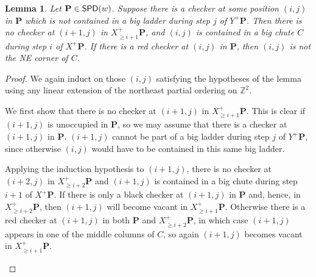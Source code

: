 \documentclass[11pt,reqno]{amsart} %
\makeatletter
\newcommand{\bbZ}{\mathbb{Z}}
\newcommand{\bfP}{\mathbf{P}}
\DeclareMathOperator{\SPD}{\sf{SPD}}
\newenvironment{shift}[1][(0,0)]{
    \begin{scope}[shift={#1}]
}{
    \end{scope}
}
\newtheorem{lemma}[theorem]{Lemma}
\theoremstyle{definition}
\newcommand{\drawSquare}[3][black,opacity=0.5]{
    \draw[#1,thin]
    (#2-0.5,#3+0.5) rectangle (#2+0.5,#3-0.5);
}
\newcommand{\drawGraySquare}[3][gray,opacity=0.3]{
    \filldraw[#1,thin]
    (#2-0.5,#3+0.5) rectangle (#2+0.5,#3-0.5);
}
\newcommand{\checkerradius}{0.38}
\newcommand{\drawXChecker}[2]{
    \fill[color=x color 2] (#1,#2) circle (\checkerradius);
    \fill[
        color=x color 1,
        pattern color=x color 1,
        pattern={Lines[distance=2pt]},
        thick
    ] (#1,#2) circle (\checkerradius);
    \draw[color=x color 1,thick] (#1,#2) circle (\checkerradius);
}
\newcommand{\drawYChecker}[2]{
    \fill[color=y color 2] (#1,#2) circle (\checkerradius);
    \fill[
        color=y color 1,
        pattern color=y color 1,
        pattern={Lines[distance=1.5pt,angle=90]},
    ] (#1,#2) circle (\checkerradius);
    \draw[color=y color 1, thick] (#1,#2) circle (\checkerradius);
}
\newcommand{\drawXYChecker}[2]{
    \drawXChecker{#1}{#2}
    \drawYChecker{#1-0.1}{#2+0.1}
}
\newcommand{\drawRCGraphTile}[3]{

    \ifnum #3=0 \fi %
    \ifnum #3=1 \drawXChecker{#1}{#2} \fi
    \ifnum #3=2 \drawYChecker{#1}{#2} \fi
    \ifnum #3=3 \drawXYChecker{#1}{#2} \fi
    \ifnum #3=4 \drawGraySquare{#1}{#2}\drawXChecker{#1}{#2} \fi
    \ifnum #3=5 \drawGraySquare{#1}{#2}\drawYChecker{#1}{#2} \fi
    \ifnum #3=6 \fi
    \ifnum #3=7 \fi
    \ifnum #3=8 \fi
    \ifnum #3=9 \drawGraySquare{#1}{#2} \fi
}
\newcommand{\drawRCGraph}[3]{
    \PD@i = 1
    \PD@j = 1
    \foreach \t in {#3}{
        \drawRCGraphTile{\number\PD@j}{-\number\PD@i}{\t}
        \drawSquare{\number\PD@j}{-\number\PD@i}
        
        \ifnum\PD@j < \numexpr#2\relax
            \global\advance\PD@j by 1
        \else
            \global\PD@j = 1
            \global\advance\PD@i by 1
        \fi
    }
}
\newcommand{\drawNorthLabels}[3]{
    \PD@j = 0
    \foreach \j in {#3}{
        \node at (#2+\PD@j,-#1) {\j};
        \global\advance\PD@j by 1
    }
}
\newcommand{\drawWestLabels}[3]{
    \PD@i = 0
    \foreach \i in {#3}{
        \node at (#2,-#1-\PD@i) {\i};
        \global\advance\PD@i by 1
    }
}
\makeatother
\begin{document}
\begin{lemma}
\label{lem:not in big ladder}
Let $\bfP \in \SPD(w)$.
Suppose there is a checker at some position $(i,j)$ in $\bfP$ which is not contained in a big ladder during step $j$ of $Y^+\bfP$.
Then there is no checker at $(i+1,j)$ in $X^+_{\geq i+1}\bfP$, and $(i,j)$ is contained in a big chute $C$ during step $i$ of $X^+\bfP$.
If there is a red checker at $(i,j)$ in $\bfP$, then $(i,j)$ is not the NE corner of $C$.
\end{lemma}

\begin{proof}
We again induct on those $(i,j)$ satisfying the hypotheses of the lemma using any linear extension of the northeast partial ordering on $\bbZ^2$.

We first show that there is no checker at $(i+1,j)$ in $X^+_{\geq i+1}\bfP$.
This is clear if $(i+1,j)$ is unoccupied in $\bfP$, so we may assume that there is a checker at $(i+1,j)$ in $\bfP$.
$(i+1,j)$ cannot be part of a big ladder during step $j$ of $Y^+\bfP$, since otherwise $(i,j)$ would have to be contained in this same big ladder.

Applying the induction hypothesis to $(i+1,j)$, there is no checker at $(i+2,j)$ in $X^+_{\geq i+2}\bfP$ and $(i+1,j)$ is contained in a big chute during step $i+1$ of $X^+\bfP$.
If there is only a black checker at $(i+1,j)$ in $\bfP$ and, hence, in $X^+_{\geq i+2}\bfP$, then $(i+1,j)$ will become vacant in $X^+_{\geq i+1}\bfP$.
Otherwise there is a red checker at $(i+1,j)$ in both $\bfP$ and $X^+_{\geq i+2}\bfP$, in which case $(i+1,j)$ appears in one of the middle columns of $C$, so again $(i+1,j)$ becomes vacant in $X^+_{\geq i+1}\bfP$.


\begin{figure}
\end{figure}
\end{proof}
\end{document}

